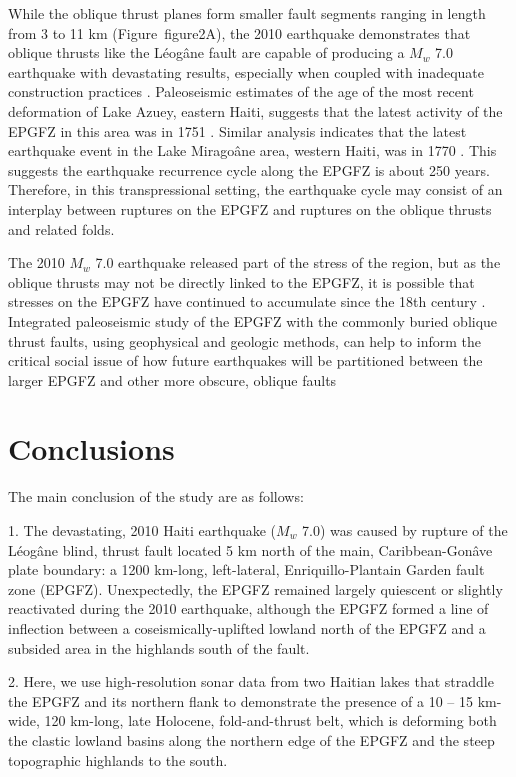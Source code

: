 \documentclass[linenumbers,draft]{agujournal}
\begin{document}
While the oblique thrust planes form smaller fault segments ranging in length from 3 to 11 km (Figure~{figure2}A), the 2010 earthquake demonstrates that oblique thrusts like the L\'eog\^ane fault are capable of producing a $M_w$ 7.0 earthquake with devastating results, especially when coupled with inadequate construction practices \citep{symithe2016present}. Paleoseismic estimates of the age of the most recent deformation of Lake Azuey, eastern Haiti, suggests that the latest activity of the EPGFZ in this area was in 1751 \citep{prentice2010seismic,bakun2012significant}. Similar analysis indicates that the latest earthquake event in the Lake Mirago\^ane area, western Haiti, was in 1770 \citep{bakun2012significant}. This suggests the earthquake recurrence cycle along the EPGFZ is about 250 years. Therefore, in this transpressional setting, the earthquake cycle may consist of an interplay between ruptures on the EPGFZ and ruptures on the oblique thrusts and related folds. 

The 2010 $M_w$ 7.0 earthquake released part of the stress of the region, but as the oblique thrusts may not be directly linked to the EPGFZ, it is possible that stresses on the EPGFZ have continued to accumulate since the 18th century \citep{prentice2010seismic}. Integrated paleoseismic study of the EPGFZ with the commonly buried oblique thrust faults, using geophysical and geologic methods, can help to inform the critical social issue of how future earthquakes will be partitioned between the larger EPGFZ and other more obscure, oblique faults

\section{Conclusions}
The main conclusion of the study are as follows: 

1. The devastating, 2010 Haiti earthquake ($M_w$ 7.0) was caused by rupture of the L\'eog\^ane blind, thrust fault located 5 km north of the main, Caribbean-Gon\^ave plate boundary: a 1200 km-long, left-lateral, Enriquillo-Plantain Garden fault zone (EPGFZ). Unexpectedly, the EPGFZ remained largely quiescent or slightly reactivated during the 2010 earthquake, although the EPGFZ formed a line of inflection between a coseismically-uplifted lowland north of the EPGFZ and a subsided area in the highlands south of the fault. 

2. Here, we use high-resolution sonar data from two Haitian lakes that straddle the EPGFZ and its northern flank to demonstrate the presence of a 10 -- 15 km-wide, 120 km-long, late Holocene, fold-and-thrust belt, which is deforming both the clastic lowland basins along the northern edge of the EPGFZ and the steep topographic highlands to the south. 
\end{document}
